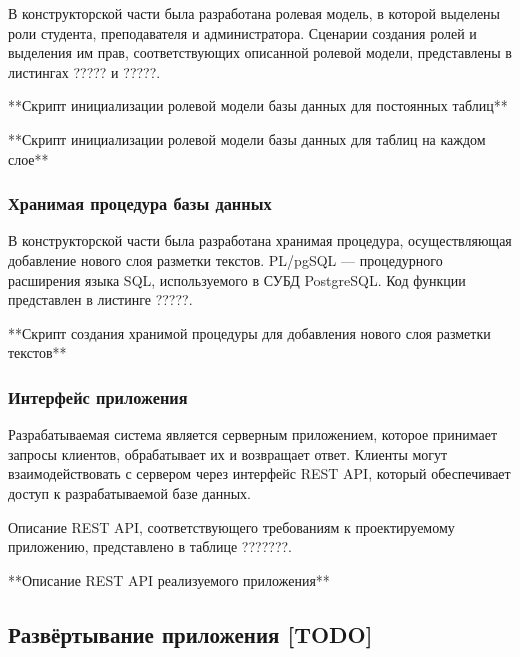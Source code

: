 
В конструкторской части была разработана ролевая модель, в которой выделены роли студента, преподавателя и администратора. Сценарии создания ролей и выделения им прав, соответствующих описанной ролевой модели, представлены в листингах ????? и ?????.

**Скрипт инициализации ролевой модели базы данных для постоянных таблиц**

**Скрипт инициализации ролевой модели базы данных для таблиц на каждом слое**

\subsubsection{Хранимая процедура базы данных}


В конструкторской части была разработана хранимая процедура, осуществляющая добавление нового слоя разметки текстов. PL/pgSQL --- процедурного расширения языка SQL, используемого в СУБД
PostgreSQL. Код функции представлен в листинге ?????.

**Скрипт создания хранимой процедуры для добавления нового слоя разметки текстов**

\subsubsection{Интерфейс приложения}


Разрабатываемая система является серверным приложением, которое принимает запросы клиентов, обрабатывает их и возвращает ответ. Клиенты могут взаимодействовать с сервером через интерфейс REST API, который обеспечивает доступ к разрабатываемой базе данных. 


Описание REST API, соответствующего требованиям к проектируемому приложению, представлено в таблице ???????.

**Описание REST API реализуемого приложения**

\subsection{Развёртывание приложения [TODO]}


